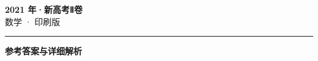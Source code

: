 \documentclass[zihao=5, a4paper]{ctexart}
\begin{document}
\begin{center}
  {\Large\bfseries 2021 年·新高考Ⅱ卷}\\[4pt]
  {\large 数学 · 印刷版}
\end{center}
\medskip
{}

\par\bigskip\hrule\bigskip
{}
\begin{center}{\large\bfseries 参考答案与详细解析}\end{center}
\smallskip

\end{document}
